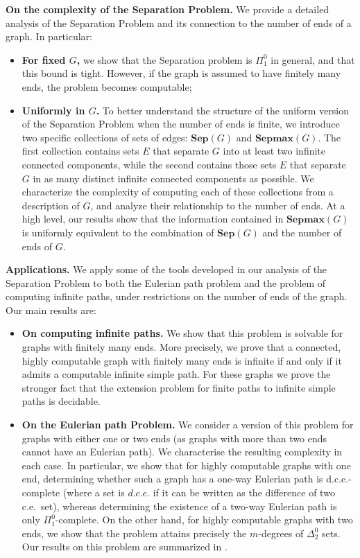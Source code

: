\documentclass[10pt,A4]{amsart}
\theoremstyle{definition}
\theoremstyle{definition}
\newcommand{\sep}[1]{\mathbf{Sep}({#1})}
\newcommand{\sepmax}[1]{\mathbf{Sepmax}({#1})}
\begin{document}
\noindent\textbf{On the complexity of the Separation Problem.} We provide a detailed analysis of the Separation Problem and its connection to the number of ends of a graph. In particular: 
        \begin{itemize}
            \item\textbf{For fixed $G$,} we show that the Separation problem is $\Pi_1^0$ in general, and that this bound is tight. However, if the graph is assumed to have finitely many ends, the problem becomes computable;
             \item\textbf{Uniformly in $G$.} To better understand the structure of the uniform version of the Separation Problem when the number of ends is finite, we introduce two specific collections of sets of edges: $\sep{G}$ and $\sepmax{G}$. The first collection contains sets $E$ that separate $G$ into at least two infinite connected components, while the second contains those sets $E$ that separate $G$ in as many distinct infinite connected components as possible. We characterize the complexity of computing each of these collections from a description of $G$, and analyze their relationship to the number of ends. At a high level, our results show that the information contained in $\sepmax{G}$ is uniformly equivalent to the combination of $\sep{G}$ and the number of ends of $G$.
        \end{itemize}
\medskip
\noindent\textbf{Applications.} We apply some of the tools developed in our analysis of the Separation Problem to both the Eulerian path problem and the problem of computing infinite paths, under restrictions on the number of ends of the graph. Our main results are:
        \begin{itemize}
            \item \textbf{On computing infinite paths.} We show that this problem is solvable for graphs with finitely many ends. More precisely, we prove that a connected, highly computable graph with finitely many ends is infinite if and only if it admits a computable infinite simple path. For these graphs we prove the stronger fact that the extension problem for finite paths to infinite simple paths is decidable. 
            \item \textbf{On the Eulerian path Problem.} We consider a version of this problem for graphs with either one or two ends (as graphs with more than two ends cannot have an Eulerian path). We characterise the resulting complexity in each case. In particular, we show that for highly computable graphs with one end, determining whether such a graph has a one-way Eulerian path is d.c.e.-complete (where a set is $d.c.e.$ if it can be written as the difference of two c.e.~set), whereas determining the existence of a two-way Eulerian path is only $\Pi_1^0$-complete. On the other hand, for highly computable graphs with two ends, we show that the problem attains precisely the $m$-degrees of $\Delta_2^0$ sets. Our results on this problem are summarized in .           
        \end{itemize}
\end{document}

